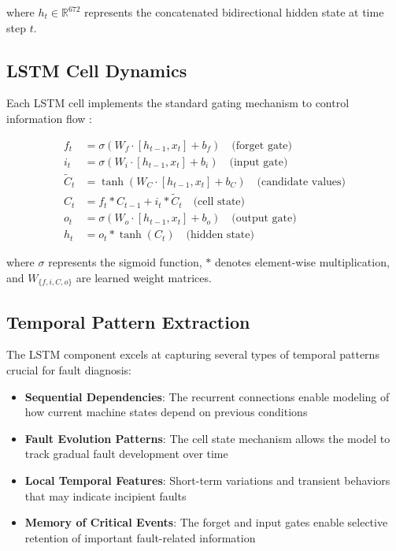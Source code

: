 where $h_t \in \mathbb{R}^{672}$ represents the concatenated bidirectional hidden state at time step $t$.

\subsection{LSTM Cell Dynamics}
\label{subsec:lstm_dynamics}

Each LSTM cell implements the standard gating mechanism to control information flow \citep{hochreiter1997long}:

\begin{align}
f_t &= \sigma(W_f \cdot [h_{t-1}, x_t] + b_f) \quad \text{(forget gate)} \\
i_t &= \sigma(W_i \cdot [h_{t-1}, x_t] + b_i) \quad \text{(input gate)} \\
\tilde{C}_t &= \tanh(W_C \cdot [h_{t-1}, x_t] + b_C) \quad \text{(candidate values)} \\
C_t &= f_t * C_{t-1} + i_t * \tilde{C}_t \quad \text{(cell state)} \\
o_t &= \sigma(W_o \cdot [h_{t-1}, x_t] + b_o) \quad \text{(output gate)} \\
h_t &= o_t * \tanh(C_t) \quad \text{(hidden state)}
\end{align}

where $\sigma$ represents the sigmoid function, $*$ denotes element-wise multiplication, and $W_{\{f,i,C,o\}}$ are learned weight matrices.

\subsection{Temporal Pattern Extraction}
\label{subsec:temporal_patterns}

The LSTM component excels at capturing several types of temporal patterns crucial for fault diagnosis:

\begin{itemize}
    \item \textbf{Sequential Dependencies}: The recurrent connections enable modeling of how current machine states depend on previous conditions
    \item \textbf{Fault Evolution Patterns}: The cell state mechanism allows the model to track gradual fault development over time
    \item \textbf{Local Temporal Features}: Short-term variations and transient behaviors that may indicate incipient faults
    \item \textbf{Memory of Critical Events}: The forget and input gates enable selective retention of important fault-related information
\end{itemize}

